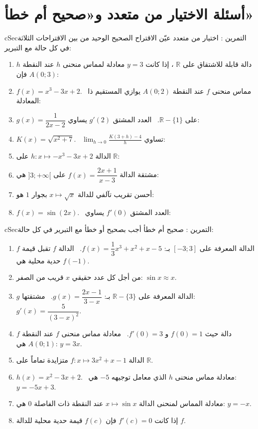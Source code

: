 \documentclass[12pt,a4paper]{article}
\newenvironment{BOX}[2]{\begin{otherlanguage}{english}\begin{arbox}{#1}{#2}}{\end{arbox}\end{otherlanguage}}
\newcounter{exo}
\newenvironment{tamrin}[1]{\stepcounter{exo}\begin{BOX}{cSec}{التمرين \theexo: #1}}{\end{BOX}}
\newcommand{\R}{\mathbb{R}}
\begin{document}
\section{أسئلة الاختيار من متعدد و«صحيح أم خطأ»}
\begin{tamrin}{اختيار من متعدد}
عيّن الاقتراح الصحيح الوحيد من بين الاقتراحات الثلاثة في كل حالة مع التبرير:
\begin{enumerate}
\item $h$ دالة قابلة للاشتقاق على $\R$ ، إذا كانت $y=3$ معادلة لمماس منحنى $h$ عند النقطة $A(0;3)$ فإن:
\item $f(x)=x^3-3x+2$. \ مماس منحنى $f$ عند النقطة $A(0;2)$ يوازي المستقيم ذا المعادلة:
\item $g(x)=\dfrac{1}{2x-2}$ على $\R-\{1\}$. \ العدد المشتق $g'(2)$ يساوي:
\item $K(x)=\sqrt{x^2+7}$. \ $\displaystyle\lim_{h\to0}\frac{K(3+h)-4}{h}$ تساوي:
\item الدالة $h:x\mapsto-x^3-3x+2$ على $\R$:
\item مشتقة الدالة $f(x)=\dfrac{2x+1}{x-3}$ على $]3;+\infty[$ هي:
\item أحسن تقريب تآلفي للدالة $x\mapsto\sqrt x$ بجوار $1$ هو:
\item $f(x)=\sin(2x)$. \ العدد المشتق $f'(0)$ يساوي:
\end{enumerate}
\end{tamrin}

\begin{tamrin}{صحيح أم خطأ}
أجب بصحيح أو خطأ مع التبرير في كل حالة:
\begin{enumerate}
\item $f$ الدالة المعرفة على $[-3;3]$ بـ: $f(x)=\dfrac13x^3+x^2+x-5$. \ الدالة $f$ تقبل قيمة حدية محلية هي $f(-1)$.
\item من أجل كل عدد حقيقي $x$ قريب من الصفر: $\sin x\approx x$.
\item $g$ الدالة المعرفة على $\R-\{3\}$ بـ: $g(x)=\dfrac{2x-1}{3-x}$. \ مشتقتها: $g'(x)=\dfrac{5}{(3-x)^2}$.
\item $f$ دالة حيث $f(0)=1$ و $f'(0)=3$. \ معادلة مماس منحنى $f$ عند النقطة $A(0;1)$ هي: $y=3x$.
\item الدالة $f:x\mapsto3x^2+x-1$ متزايدة تماماً على $\R$.
\item $h(x)=x^2-3x+2$. \ معادلة مماس منحنى $h$ الذي معامل توجيهه $-5$ هي: $y=-5x+3$.
\item معادلة المماس لمنحنى الدالة $x\mapsto\sin x$ عند النقطة ذات الفاصلة $0$ هي: $y=-x$.
\item إذا كانت $f'(c)=0$ فإن $f(c)$ قيمة حدية محلية للدالة $f$.
\end{enumerate}
\end{tamrin}
\end{document}
